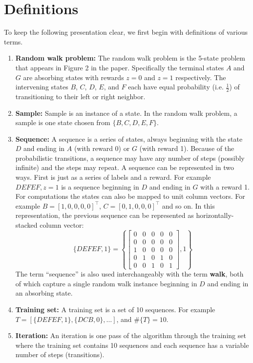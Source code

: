 \documentclass[conference]{IEEEtran}
\begin{document}
\section{Definitions}
To keep the following presentation clear, we first begin with definitions of various terms.
\begin{enumerate}
\item{\bf Random  walk problem:} The random walk problem is the 5-state problem that appears in Figure 2 in the paper. Specifically the terminal states $A$ and $G$ are absorbing states with rewards $z = 0$ and $z = 1$ respectively. The intervening states $B$, $C$, $D$, $E$, and $F$ each have equal probability (i.e. $\frac{1}{2}$) of transitioning to their left or right neighbor.
\item{\bf Sample:} Sample is an instance of a state. In the random walk problem, a sample is one state chosen from $\{B, C, D, E, F\}$.
\item{\bf Sequence:} A sequence is a series of states, always beginning with the state $D$ and ending in $A$ (with reward 0) or $G$ (with reward 1). Because of the probabilistic transitions, a sequence may have any number of steps (possibly infinite) and the steps may repeat. A sequence can be represented in two ways. First is just as a series of labels and a reward. For example ${DEFEF, z=1}$ is a sequence beginning in $D$ and ending in $G$ with a reward 1. For computations the states can also be mapped to unit column vectors. For example $B = [1, 0, 0, 0, 0]^\intercal$, $C = [0, 1, 0, 0, 0]^\intercal$ and so on. In this representation, the previous sequence can be represented as horizontally-stacked column vector:
\begin{equation*}
\{DEFEF, 1\} =
    \left\{ 
        \begin{bmatrix}
        0 & 0 & 0 & 0 & 0 \\
        0 & 0 & 0 & 0 & 0 \\
        1 & 0 & 0 & 0 & 0 \\
        0 & 1 & 0 & 1 & 0 \\
        0 & 0 & 1 & 0 & 1 
        \end{bmatrix},1
    \right\}
\end{equation*}
The term ``sequence'' is also used interchangeably with the term {\bf walk}, both of which capture a single random walk instance beginning in $D$ and ending in an absorbing state. 
\item{\bf Training set:} A training set is a set of 10 sequences. For example $T = [\{DEFEF, 1\},\{DCB, 0\}, \ldots]$, and $\#\{T\}=10$.
\item{\bf Iteration:} An iteration is one pass of the algorithm through the training set where the training set contains 10 sequences and each sequence has a variable number of steps (transitions). 
\end{enumerate}
\end{document}
